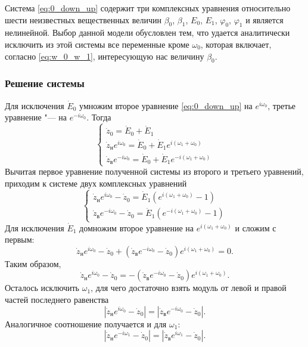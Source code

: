 \documentclass[../main.tex]{subfiles}
\begin{document}
Система \eqref{eq:0_down_up} содержит три комплексных уравнения относительно шести неизвестных вещественных величин $\beta_0$, $\beta_1$, $E_0$, $E_1$, $\varphi_0$, $\varphi_1$ и является нелинейной. Выбор данной модели обусловлен тем, что удается аналитически исключить из этой системы все переменные кроме $\omega_0$, которая включает, согласно \eqref{eq:w_0_w_1}, интересующую нас величину $\beta_0$.

\subsubsection{Решение системы}
Для исключения $\dot{E}_0$ умножим второе уравнение \eqref{eq:0_down_up} на $e^{i\omega_0}$, третье уравнение "--- на $e^{-i\omega_0}$. Тогда
\begin{equation*}
  \begin{cases}
    \dot{z}_0 = \dot{E}_0 + \dot{E}_1 \\
    \dot{z}_\text{н} e^{ i\omega_0} = \dot{E}_0 + \dot{E}_1 e^{ i \left(\omega_1 + \omega_0 \right)} \\
    \dot{z}_\text{в} e^{-i\omega_0} = \dot{E}_0 + \dot{E}_1 e^{-i \left(\omega_1 + \omega_0\right)}
  \end{cases}
\end{equation*}
Вычитая первое уравнение полученной системы из второго и третьего уравнений, приходим к системе двух комплексных уравнений
\begin{equation*}
  \begin{cases}
    \dot{z}_\text{н} e^{ i\omega_0} - \dot{z}_0 = \dot{E}_1 \left( e^{ i\left(\omega_1 + \omega_0 \right)} - 1\right) \\
    \dot{z}_\text{в} e^{-i\omega_0} - \dot{z}_0 = \dot{E}_1 \left( e^{-i\left(\omega_1 + \omega_0 \right)} - 1 \right)
  \end{cases}
\end{equation*}
Для исключения $\dot{E}_1$ домножим второе уравнение на $e^{i \left(\omega_1 + \omega_0 \right)}$ и сложим с первым:
\begin{equation*}
    \dot{z}_\text{н} e^{i\omega_0} - \dot{z}_0 + \left(\dot{z}_\text{в} e^{-i\omega_0} - \dot{z}_0 \right) e^{i \left(\omega_1 + \omega_0 \right)} = 0.
\end{equation*}
Таким образом,
\begin{equation*}
   \dot{z}_\text{н} e^{i\omega_0} - \dot{z}_0 = -\left(\dot{z}_\text{в} e^{-i\omega_0} - \dot{z}_0 \right) e^{i\left(\omega_1+\omega_0\right)}.
\end{equation*}
Осталось исключить $\omega_1$, для чего достаточно взять модуль от левой и правой частей последнего равенства
\begin{equation} \label{eq:w_0}
   \left|\dot{z}_\text{н} e^{i\omega_0} - \dot{z}_0 \right| = \left|\dot{z}_\text{в} e^{-i\omega_0} - \dot{z}_0\right|.
\end{equation}
Аналогичное соотношение получается и для $\omega_1$:
\begin{equation} \label{eq:w_1}
   \left|\dot{z}_\text{н} e^{-i\omega_1} - \dot{z}_0 \right| = \left|\dot{z}_\text{в} e^{i\omega_1} - \dot{z}_0 \right|.
\end{equation}
\end{document}
